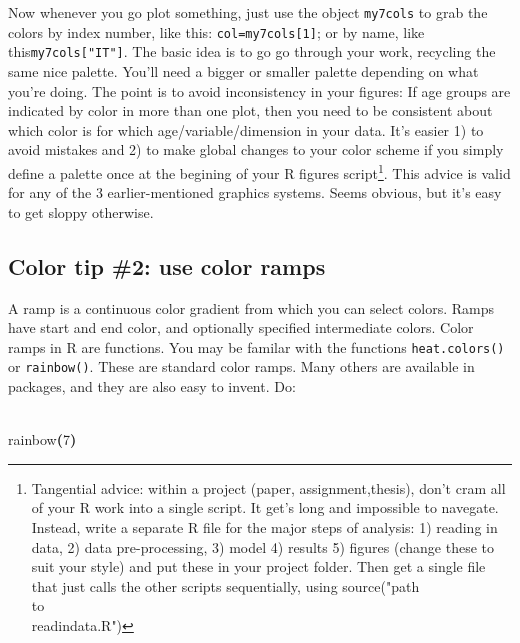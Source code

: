 \documentclass[a4paper]{article}
\newcommand{\hlnumber}[1]{\textcolor[rgb]{0.0823529411764706,0.0784313725490196,0.709803921568627}{#1}}%
\newcommand{\hlfunctioncall}[1]{\textcolor[rgb]{1,0,0}{#1}}%
\newcommand{\hlkeyword}[1]{\textcolor[rgb]{0,0,0}{\textbf{#1}}}%
\newcommand{\hlprompt}[1]{\textcolor[rgb]{0,0,0}{#1}}%
\newcommand{\hlstd}[1]{\textcolor[rgb]{0,0,0}{#1}}%
\newenvironment{Houtput}{\raggedright}{%
%
}
\renewenvironment{Schunk}{\vspace{\topsep}}{\vspace{\topsep}}
\begin{document}
Now whenever you go plot something, just use the object \texttt{my7cols} to grab the colors by index number, like this: \texttt{col=my7cols[1]}; or by name, like this\texttt{my7cols["IT"]}. The basic idea is to go go through your work, recycling the same nice palette. You'll need a bigger or smaller palette depending on what you're doing. The point is to avoid inconsistency in your figures: If age groups are indicated by color in more than one plot, then you need to be consistent about which color is for which age/variable/dimension in your data. It's easier 1) to avoid mistakes and 2) to make global changes to your color scheme if you simply define a palette once at the begining of your R figures script\footnote{Tangential advice: within a project (paper, assignment,thesis), don't cram all of your R work into a single script. It get's long and impossible to navegate. Instead, write a separate R file for the major steps of analysis: 1) reading in data, 2) data pre-processing, 3) model 4) results 5) figures (change these to suit your style) and put these in your project folder. Then get a single file that just calls the other scripts sequentially, using source("path\\to\\readindata.R")}. This advice is valid for any of the 3 earlier-mentioned graphics systems. Seems obvious, but it's easy to get sloppy otherwise.

\subsection{Color tip \#2: use color ramps}
A ramp is a continuous color gradient from which you can select colors. Ramps have start and end color, and optionally specified intermediate colors. Color ramps in R are functions. You may be familar with the functions \texttt{heat.colors()} or \texttt{rainbow()}. These are standard color ramps. Many others are available in packages, and they are also easy to invent. Do:

\begin{Houtput}
\hspace*{\fill}\\
\hlstd{}\ttfamily\noindent
\hlprompt{\usebox{\hlnormalsizeboxgreaterthan}{\ }}\hlfunctioncall{rainbow}\hlkeyword{(}\hlnumber{7}\hlkeyword{)}\mbox{}
\normalfont
\hspace*{\fill}\\
\hlstd{}\begin{Schunk}

\end{Schunk}
\end{Houtput}
\end{document}
